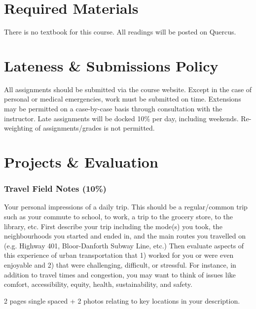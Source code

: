 \documentclass[11pt]{article}
\begin{document}
	
	
	\section*{Required Materials}
	
	There is no textbook for this course. All readings will be posted on Quercus.
	

	
	\section*{Lateness \& Submissions Policy}
	
	All assignments should be submitted via the course website. Except in the case of personal or medical emergencies, work must be submitted on time. Extensions may be permitted on a case-by-case basis through consultation with the instructor. Late assignments will be docked 10\% per day, including weekends. Re-weighting of assignments/grades is not permitted.
	
	
	
	
		
	

	\section*{Projects \& Evaluation}
	
	
	\subsubsection*{Travel Field Notes (10\%)}
	
	Your personal impressions of a daily trip. This should be a regular/common trip such as your commute to school, to work, a trip to the grocery store, to the library, etc. First describe your trip including the mode(s) you took, the neighbourhoods you started and ended in, and the main routes you travelled on (e.g. Highway 401, Bloor-Danforth Subway Line, etc.)
	Then evaluate aspects of this experience of urban transportation that 1) worked for you or were even enjoyable and 2) that were challenging, difficult, or stressful. For instance, in addition to travel times and congestion, you may want to think of issues like comfort, accessibility, equity, health, sustainability, and safety.	
	
	2 pages single spaced + 2 photos relating to key locations in your description.
	
\end{document}
